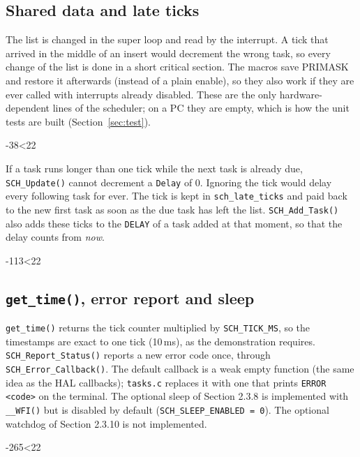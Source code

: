 \documentclass[12pt,a4paper]{article}
\numberwithin{figure}{section}
\numberwithin{table}{section}
\newcommand{\srcbody}[4]{}
\newcommand{\src}[4]{\par\ifnum\numexpr#3-#2\relax<22 \noindent\begin{minipage}{\linewidth}\srcbody{#1}{#2}{#3}{#4}\end{minipage}\else\srcbody{#1}{#2}{#3}{#4}\fi\par}
\newcommand{\code}[1]{\texttt{#1}}
\begin{document}
\subsection{Shared data and late ticks}
\label{sec:late}
The list is changed in the super loop and read by the interrupt. A tick that arrived in the middle of an insert would decrement the wrong task, so every change of the list is done in a short critical section. The macros save PRIMASK and restore it afterwards (instead of a plain enable), so they also work if they are ever called with interrupts already disabled. These are the only hardware-dependent lines of the scheduler; on a PC they are empty, which is how the unit tests are built (Section~\ref{sec:test}).
\src{scheduler.c}{38}{47}{Port section}

If a task runs longer than one tick while the next task is already due, \code{SCH\_Update()} cannot decrement a \code{Delay} of 0. Ignoring the tick would delay every following task for ever. The tick is kept in \code{sch\_late\_ticks} and paid back to the new first task as soon as the due task has left the list. \code{SCH\_Add\_Task()} also adds these ticks to the \code{DELAY} of a task added at that moment, so that the delay counts from \emph{now}.
\src{scheduler.c}{113}{128}{Paying back the late ticks}

\subsection{\code{get\_time()}, error report and sleep}
\code{get\_time()} returns the tick counter multiplied by \code{SCH\_TICK\_MS}, so the timestamps are exact to one tick (10\,ms), as the demonstration requires. \code{SCH\_Report\_Status()} reports a new error code once, through \code{SCH\_Error\_Callback()}. The default callback is a weak empty function (the same idea as the HAL callbacks); \code{tasks.c} replaces it with one that prints \code{ERROR <code>} on the terminal. The optional sleep of Section 2.3.8 is implemented with \code{\_\_WFI()} but is disabled by default (\code{SCH\_SLEEP\_ENABLED = 0}). The optional watchdog of Section 2.3.10 is not implemented.
\src{scheduler.c}{265}{291}{\code{get\_time()}, error report and sleep}
\end{document}
